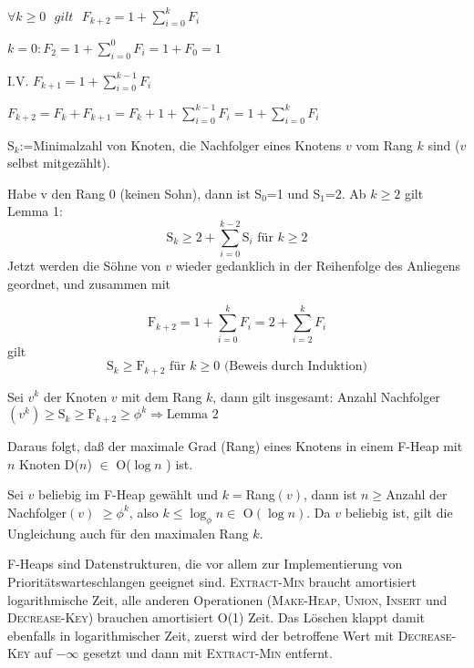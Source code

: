 \begin{satz}[Hilfssatz]
$\forall k \geq 0 \mbox{ }gilt \mbox{ } F_{k+2}=1+\sum_{i=0}^k F_i$
\end{satz}

\begin{beweis}
$k=0 : F_2=1+\sum_{i=0}^0 F_i = 1+ F_0 =1$

\noindent I.V. $F_{k+1}=1+\sum_{i=0}^{k-1} F_i$

\noindent $F_{k+2}=F_{k}+F_{k+1}=F_k + 1 + \sum_{i=0}^{k-1} F_i = 1+\sum_{i=0}^k F_i$
\end{beweis}

\begin{beweis}[Lemma 2]
S$_k$:=Minimalzahl von Knoten, die Nachfolger eines Knotens $v$ vom Rang $k$ sind ($v$ selbst mitgezählt).

\noindent Habe v den Rang 0 (keinen Sohn), dann ist S$_0$=1 und S$_1$=2. Ab $k \geq 2$ gilt Lemma 1:
\[\mbox{S}_k \geq 2 + \sum_{i=0}^{k-2} \mbox{S}_i \mbox{ für }k \geq 2\]
Jetzt werden die Söhne von $v$ wieder gedanklich in der Reihenfolge des Anliegens geord\-net, und zusammen mit

\[\mbox{F}_{k+2}=1+\sum_{i=0}^k F_i=2+\sum_{i=2}^k F_i\] gilt \[\mbox{S}_k \geq \mbox{F}_{k+2} \mbox{ für } k \geq 0
\mbox{ (Beweis durch Induktion)}\]

Sei $v^k$ der Knoten $v$ mit dem Rang $k$, dann gilt insgesamt: Anzahl Nachfolger$(v^k) \geq \mbox{S}_k \geq
\mbox{F}_{k+2} \geq {\phi}^k \Rightarrow \mbox{Lemma 2}$ 
\end{beweis}
Daraus folgt, daß der maximale Grad (Rang) eines Knotens in einem F-Heap mit $n$ Knoten D($n$) $\in$ O($\log n$ ) ist.

\begin{beweis}
Sei $v$ beliebig im F-Heap gewählt und $k=$Rang$(v)$, dann ist $n \geq$Anzahl der Nachfolger$(v)$ $\geq {\phi}^k$, also
$k \leq \log_{\phi} n \in \mbox{ O}(\log n)$. Da $v$ beliebig ist, gilt die Ungleichung auch für den maximalen Rang
$k$. 
\end{beweis}
F-Heaps sind Datenstrukturen, die vor allem zur Implementierung von Prioritätswarte\-schlangen geeignet sind.
\textsc{Extract-Min} braucht amortisiert logarithmische Zeit, alle anderen Operationen (\textsc{Make-Heap},
\textsc{Union}, \textsc{Insert} und \textsc{Decrease-Key}) brauchen amortisiert O(1) Zeit. Das Löschen klappt damit
ebenfalls in logarithmischer Zeit, zuerst wird der betroffene Wert mit \textsc{Decrease-Key} auf $- \infty$ gesetzt
und dann mit \textsc{Extract-Min} entfernt.

